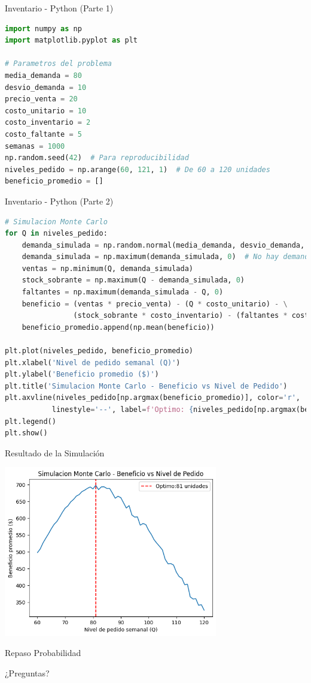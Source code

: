 \documentclass{beamer}
\begin{document}
\begin{frame}[fragile]{Inventario - Python (Parte 1)}
    \begin{lstlisting}[language=Python]
import numpy as np
import matplotlib.pyplot as plt

# Parametros del problema
media_demanda = 80
desvio_demanda = 10
precio_venta = 20
costo_unitario = 10
costo_inventario = 2
costo_faltante = 5
semanas = 1000
np.random.seed(42)  # Para reproducibilidad
niveles_pedido = np.arange(60, 121, 1)  # De 60 a 120 unidades
beneficio_promedio = []
    \end{lstlisting}
\end{frame}

\begin{frame}[fragile]{Inventario - Python (Parte 2)}
    \begin{lstlisting}[language=Python]
# Simulacion Monte Carlo
for Q in niveles_pedido:
    demanda_simulada = np.random.normal(media_demanda, desvio_demanda, semanas).round().astype(int)
    demanda_simulada = np.maximum(demanda_simulada, 0)  # No hay demanda negativa
    ventas = np.minimum(Q, demanda_simulada)
    stock_sobrante = np.maximum(Q - demanda_simulada, 0)
    faltantes = np.maximum(demanda_simulada - Q, 0)
    beneficio = (ventas * precio_venta) - (Q * costo_unitario) - \
                (stock_sobrante * costo_inventario) - (faltantes * costo_faltante)
    beneficio_promedio.append(np.mean(beneficio))

plt.plot(niveles_pedido, beneficio_promedio)
plt.xlabel('Nivel de pedido semanal (Q)')
plt.ylabel('Beneficio promedio ($)')
plt.title('Simulacion Monte Carlo - Beneficio vs Nivel de Pedido')
plt.axvline(niveles_pedido[np.argmax(beneficio_promedio)], color='r', 
           linestyle='--', label=f'Optimo: {niveles_pedido[np.argmax(beneficio_promedio)]} unidades')
plt.legend()
plt.show()
    \end{lstlisting}
\end{frame}

\begin{frame}{Resultado de la Simulación}
    \begin{center}
        \includegraphics[width=0.7\textwidth]{montecarlo.png}
    \end{center}
\end{frame}

\begin{frame}{Repaso Probabilidad}
    \begin{center}
        \Large{¿Preguntas?}
    \end{center}
\end{frame}
\end{document}
